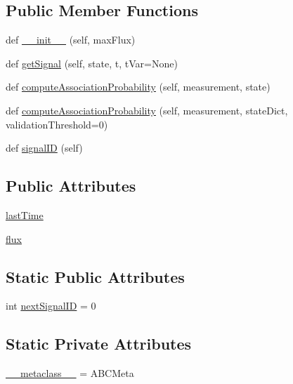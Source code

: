 \subsection*{Public Member Functions}
\begin{DoxyCompactItemize}
\item 
def \hyperlink{classmodest_1_1signals_1_1poissonsource_1_1DynamicPoissonSource_a03a62ccbee75ae9feb563f63f046b20d}{\+\_\+\+\_\+init\+\_\+\+\_\+} (self, max\+Flux)
\item 
def \hyperlink{classmodest_1_1signals_1_1poissonsource_1_1DynamicPoissonSource_aa6030c607a4bded71c622f5f132c9bfe}{get\+Signal} (self, state, t, t\+Var=None)
\item 
def \hyperlink{classmodest_1_1signals_1_1poissonsource_1_1DynamicPoissonSource_a086252814ef8c2ddd3f4331dcfbbb827}{compute\+Association\+Probability} (self, measurement, state)
\item 
def \hyperlink{classmodest_1_1signals_1_1signalsource_1_1SignalSource_a3d32dbed840ea9ac775b226f0a654831}{compute\+Association\+Probability} (self, measurement, state\+Dict, validation\+Threshold=0)
\item 
def \hyperlink{classmodest_1_1signals_1_1signalsource_1_1SignalSource_a9a64c6a9c2954f6ad61e4ca3518ea8ab}{signal\+ID} (self)
\end{DoxyCompactItemize}
\subsection*{Public Attributes}
\begin{DoxyCompactItemize}
\item 
\hyperlink{classmodest_1_1signals_1_1poissonsource_1_1PoissonSource_a34395fc83bd8743a0a5ee69f9392a606}{last\+Time}
\item 
\hyperlink{classmodest_1_1signals_1_1poissonsource_1_1PoissonSource_a6f2c657ad936b921715d826ac74f7fe5}{flux}
\end{DoxyCompactItemize}
\subsection*{Static Public Attributes}
\begin{DoxyCompactItemize}
\item 
int \hyperlink{classmodest_1_1signals_1_1signalsource_1_1SignalSource_a453eafb550b551adbec0903deb63dfce}{next\+Signal\+ID} = 0
\end{DoxyCompactItemize}
\subsection*{Static Private Attributes}
\begin{DoxyCompactItemize}
\item 
\hyperlink{classmodest_1_1signals_1_1poissonsource_1_1DynamicPoissonSource_aa41498abaa3f69680ada7902aba5890f}{\+\_\+\+\_\+metaclass\+\_\+\+\_\+} = A\+B\+C\+Meta
\end{DoxyCompactItemize}


